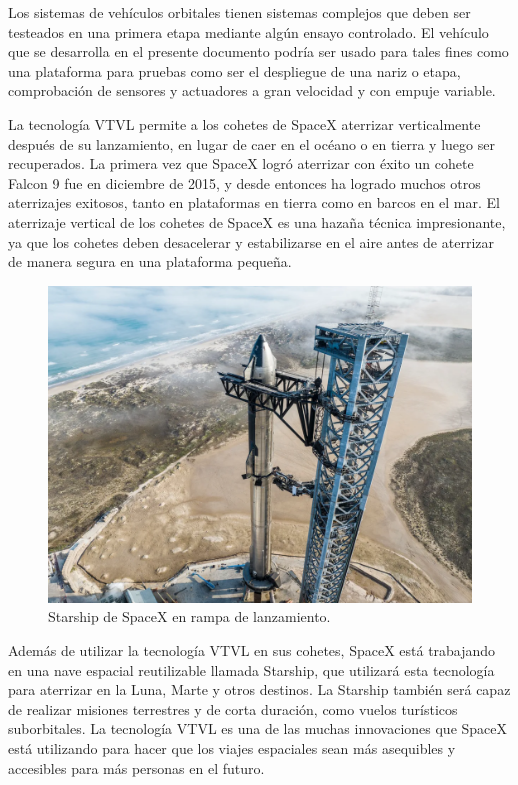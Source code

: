 \medskip


Los sistemas de vehículos orbitales tienen sistemas complejos que deben ser testeados en una primera etapa mediante algún ensayo controlado. El vehículo que se desarrolla en el presente documento podría ser usado para tales fines como una plataforma para pruebas como ser el despliegue de una nariz o etapa, comprobación de sensores y actuadores a gran velocidad y con empuje variable.

\medskip

La tecnología VTVL permite a los cohetes de SpaceX aterrizar verticalmente después de su lanzamiento, en lugar de caer en el océano o en tierra y luego ser recuperados. La primera vez que SpaceX logró aterrizar con éxito un cohete Falcon 9 fue en diciembre de 2015, y desde entonces ha logrado muchos otros aterrizajes exitosos, tanto en plataformas en tierra como en barcos en el mar. El aterrizaje vertical de los cohetes de SpaceX es una hazaña técnica impresionante, ya que los cohetes deben desacelerar y estabilizarse en el aire antes de aterrizar de manera segura en una plataforma pequeña.


\begin{figure}[htb]
    \centering
    \includegraphics[width=0.8\linewidth]{fig/starhip2.png}
    \caption{Starship de SpaceX en rampa de lanzamiento.}
    \label{fig:starshipcool}
\end{figure}


Además de utilizar la tecnología VTVL en sus cohetes, SpaceX está trabajando en una nave espacial reutilizable llamada Starship, que utilizará esta tecnología para aterrizar en la Luna, Marte y otros destinos. La Starship también será capaz de realizar misiones terrestres y de corta duración, como vuelos turísticos suborbitales. La tecnología VTVL es una de las muchas innovaciones que SpaceX está utilizando para hacer que los viajes espaciales sean más asequibles y accesibles para más personas en el futuro.

